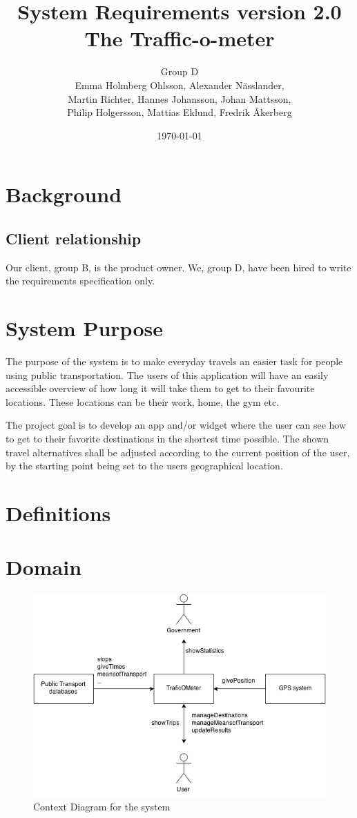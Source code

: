 \documentclass[a4paper]{article}
\title{System Requirements version 2.0\\ The Traffic-o-meter}
\author{Group D\\ Emma Holmberg Ohlsson, Alexander Nässlander,\\Martin Richter, Hannes Johansson, Johan Mattsson,\\Philip Holgersson, Mattias Eklund, Fredrik Åkerberg}
\date{\today}
\begin{document}
	\maketitle
	\thispagestyle{empty}
	\setcounter{page}{0}
	\pagebreak
	\tableofcontents
	\thispagestyle{empty}
	\pagebreak
	



	\section{Background} %
	\label{sec:background}
	
		\subsection{Client relationship}
	Our client, group B, is the product owner. We, group D, have been hired to write the requirements specification only.

	\section{System Purpose} %
	The purpose of the system is to make everyday travels an easier task for people using public transportation. The users of this application will have an easily accessible overview of how long it will take them to get to their favourite locations. These locations can be their work, home, the gym etc.
	
	
The project goal is to develop an app and/or widget where the user can see how to get to their favorite destinations in the shortest time possible. The shown travel alternatives shall be adjusted according to the current position of the user, by the starting point being set to the users geographical location.
	\section{Definitions}
		
	\section{Domain}
		\begin{figure}[h]
				\includegraphics[scale=0.65]{img/Context-v1.png}
			\caption{Context Diagram for the system}
		\end{figure}
\end{document}
